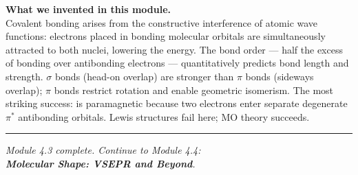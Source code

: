 \documentclass[12pt, a4paper]{book}
\begin{document}
\vspace{1.5em}
\begin{center}
\begin{tcolorbox}[enhanced, colback=DiscoveryColor!8, colframe=DiscoveryColor,
  width=0.88\textwidth, arc=3pt]
\centering\sffamily\small
\textbf{What we invented in this module.}\\[4pt]
Covalent bonding arises from the constructive interference of
atomic wave functions: electrons placed in bonding molecular
orbitals are simultaneously attracted to both nuclei,
lowering the energy.
The bond order --- half the excess of bonding over antibonding
electrons --- quantitatively predicts bond length and strength.
$\sigma$ bonds (head-on overlap) are stronger than $\pi$ bonds
(sideways overlap); $\pi$ bonds restrict rotation and enable
geometric isomerism.
The most striking success:  is paramagnetic
because two electrons enter separate degenerate
$\pi^*$ antibonding orbitals.
Lewis structures fail here; MO theory succeeds.
\end{tcolorbox}
\end{center}

\vspace{2em}
\noindent\textcolor{JourneyColor!40}{\rule{\textwidth}{0.6pt}}
\begin{center}\textit{\sffamily\small
Module 4.3 complete. Continue to Module 4.4:\\
\textbf{Molecular Shape: VSEPR and Beyond}.}
\end{center}
\end{document}
